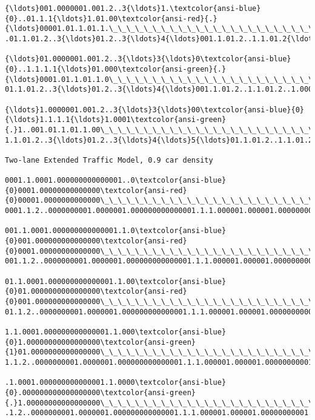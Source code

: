 \documentclass[11pt]{article}
\begin{document}
\begin{Verbatim}[commandchars=\\\{\},fontsize=\footnotesize]
{\ldots}001.0000001.001.2..3{\ldots}1.\textcolor{ansi-blue}{0}..01.1.1{\ldots}1.01.00\textcolor{ansi-red}{.}{\ldots}00001.01.1.01.1.\_\_\_\_\_\_\_\_\_\_\_\_\_\_\_\_\_\_\_\_\_\_\_\_\_\_\_\_\_\_
.01.1.01.2..3{\ldots}01.2..3{\ldots}4{\ldots}001.1.01.2..1.1.01.2{\ldots}000001.1.0001.1.2..2..1.001.2{\ldots}1.2..1

{\ldots}01.0000001.001.2..3{\ldots}3{\ldots}0\textcolor{ansi-blue}{0}..1.1.1.1{\ldots}01.000\textcolor{ansi-green}{.}{\ldots}0001.01.1.01.1.0\_\_\_\_\_\_\_\_\_\_\_\_\_\_\_\_\_\_\_\_\_\_\_\_\_\_\_\_\_\_
01.1.01.2..3{\ldots}01.2..3{\ldots}4{\ldots}001.1.01.2..1.1.01.2..1.00001.1.0001.1.2..2..1.001.2..3{\ldots}2..1.

{\ldots}1.0000001.001.2..3{\ldots}3{\ldots}00\textcolor{ansi-blue}{0}{\ldots}1.1.1.1{\ldots}1.0001\textcolor{ansi-green}{.}1..001.01.1.01.1.00\_\_\_\_\_\_\_\_\_\_\_\_\_\_\_\_\_\_\_\_\_\_\_\_\_\_\_\_\_\_
1.1.01.2..3{\ldots}01.2..3{\ldots}4{\ldots}5{\ldots}01.1.01.2..1.1.01.2..1.00001.1.0001.1.2..2..1.001.2..3{\ldots}3{\ldots}1.0

Two-lane Extended Traffic Model, 0.9 car density

0001.1.0001.000000000000001..0\textcolor{ansi-blue}{0}0001.00000000000000\textcolor{ansi-red}{0}00001.0000000000000\_\_\_\_\_\_\_\_\_\_\_\_\_\_\_\_\_\_\_\_\_\_\_\_\_\_\_\_\_\_
0001.1.2..0000000001.0000001.000000000000001.1.1.000001.000001.00000000001.1.00000000000000000000000

001.1.0001.000000000000001.1.0\textcolor{ansi-blue}{0}001.000000000000000\textcolor{ansi-red}{0}0001.00000000000000\_\_\_\_\_\_\_\_\_\_\_\_\_\_\_\_\_\_\_\_\_\_\_\_\_\_\_\_\_\_
001.1.2..0000000001.0000001.000000000000001.1.1.000001.000001.00000000001.1.000000000000000000000000

01.1.0001.000000000000001.1.00\textcolor{ansi-blue}{0}01.0000000000000000\textcolor{ansi-red}{0}001.000000000000000\_\_\_\_\_\_\_\_\_\_\_\_\_\_\_\_\_\_\_\_\_\_\_\_\_\_\_\_\_\_
01.1.2..0000000001.0000001.000000000000001.1.1.000001.000001.00000000001.1.0000000000000000000000000

1.1.0001.000000000000001.1.000\textcolor{ansi-blue}{0}1.00000000000000000\textcolor{ansi-green}{1}01.0000000000000000\_\_\_\_\_\_\_\_\_\_\_\_\_\_\_\_\_\_\_\_\_\_\_\_\_\_\_\_\_\_
1.1.2..0000000001.0000001.000000000000001.1.1.000001.000001.00000000001.1.00000000000000000000000000

.1.0001.000000000000001.1.0000\textcolor{ansi-blue}{0}.000000000000000000\textcolor{ansi-green}{.}1.00000000000000000\_\_\_\_\_\_\_\_\_\_\_\_\_\_\_\_\_\_\_\_\_\_\_\_\_\_\_\_\_\_
.1.2..0000000001.0000001.000000000000001.1.1.000001.000001.00000000001.1.000000000000000000000000001

    \end{Verbatim}
\end{document}
